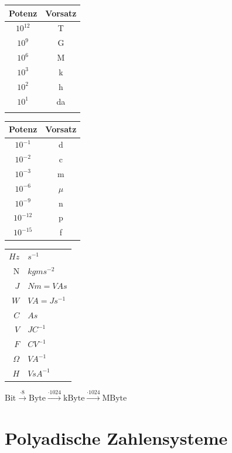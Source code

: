 \documentclass[6pt,a4paper]{scrartcl}
\begin{document}
\begin{multicols}{3}
{\begin{tabular}{c | c}
	Potenz & Vorsatz \\ \midrule
	$10^{12}$ & T \\
	$10^{9}$ & G \\
	$10^{6}$ & M \\
	$10^{3}$ & k \\
	$10^{2}$ & h \\
	$10^{1}$ & da \\ 
	&
\end{tabular}
\quad 
\begin{tabular}{c | c}
	Potenz & Vorsatz \\ \midrule
	$10^{-1}$ & d \\
	$10^{-2}$ & c \\
	$10^{-3}$ & m \\
	$10^{-6}$ & $\mu$	\\
	$10^{-9}$ & n \\
	$10^{-12}$ & p \\
	$10^{-15}$ & f
\end{tabular}
\quad 
\begin{tabular}{ r | l }
$Hz$ & $s^{-1}$ \\
N & $kg m s^{-2} $ \\
$J $ & $ N m = V A s$\\
$W $ & $ V A  = J s^{-1} $ \\
$ C $ & $ A s $ \\
$V $ & $ J C^{-1} $\\
$F $ & $ C V^{-1} $ \\
$\Omega $ & $ V A^{-1} $\\
$ H $ & $ V s  A^{-1}$
\end{tabular}

$\text{Bit} \xrightarrow{\cdot 8} \text{Byte} \xrightarrow{\cdot 1024} \text{kByte} \xrightarrow{\cdot 1024} \text{MByte}$
}

\section{Polyadische Zahlensysteme}

\end{multicols}
\end{document}
